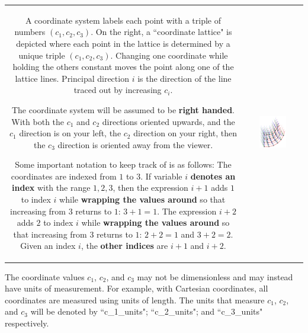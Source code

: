 \begin{tabular}{cc}
\parbox{0.5\textwidth}{
A coordinate system labels each point with a triple of numbers \((c_1, c_2, c_3)\). On the right, a ``coordinate lattice" is depicted where each point in the lattice is determined by a unique triple \((c_1, c_2, c_3)\). Changing one coordinate while holding the others constant moves the point along one of the lattice lines. Principal direction \(i\) is the direction of the line traced out by increasing \(c_i\).

The coordinate system will be assumed to be {\bf right handed}. With both the \(c_1\) and \(c_2\) directions oriented upwards, and the \(c_1\) direction is on your left, the \(c_2\) direction on your right, then the \(c_3\) direction is oriented away from the viewer.

Some important notation to keep track of is as follows: The coordinates are indexed from \(1\) to \(3\). If variable \(i\) {\bf denotes an index} with the range \(1, 2, 3\), then the expression \(i + 1\) adds \(1\) to index \(i\) while {\bf wrapping the values around} so that increasing from \(3\) returns to \(1\): \(3 + 1 = 1\). The expression \(i + 2\) adds \(2\) to index \(i\) while {\bf wrapping the values around} so that increasing from \(3\) returns to \(1\): \(2 + 2 = 1\) and \(3 + 2 = 2\). Given an index \(i\), the {\bf other indices} are \(i+1\) and \(i+2\).
} & \parbox{0.5\textwidth}{
\includegraphics[width = 0.5\textwidth]{Coordinate_systems/coordinate_system_lattice}
}
\end{tabular}

\vspace{1mm}

The coordinate values \(c_1\), \(c_2\), and \(c_3\) may not be dimensionless and may instead have units of measurement. For example, with Cartesian coordinates, all coordinates are measured using units of length. The units that measure \(c_1\), \(c_2\), and \(c_3\) will be denoted by ``c\_1\_units"; ``c\_2\_units"; and ``c\_3\_units" respectively. 

